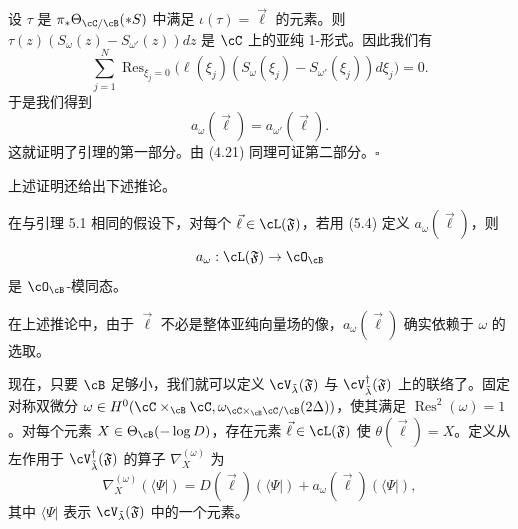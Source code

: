 


设 $\tau$ 是 $\pi_*\Theta_{\cC/\cB}(*S)$ 中满足 $\iota(\tau)=\vec\ell$ 的元素。则 $\tau(z)(S_\omega(z)-S_{\omega'}(z))dz$ 是 $\cC$ 上的亚纯 1-形式。因此我们有
\[
 \sum_{j=1}^{N}\operatorname{Res}_{\xi_j=0}
 \big(\ell(\xi_j)(S_\omega(\xi_j)-S_{\omega'}(\xi_j))d\xi_j\big)=0.
\]
于是我们得到
\[
 a_\omega(\vec\ell)=a_{\omega'}(\vec\ell).
\]
这就证明了引理的第一部分。由 (4.21) 同理可证第二部分。\hfill$\square$

上述证明还给出下述推论。

\begin{corollary}[5.2]
 在与引理 5.1 相同的假设下，对每个 $\vec\ell\in\cL(\mathfrak F)$，若用 (5.4) 定义 $a_\omega(\vec\ell)$，则
 \[
  a_\omega:\cL(\mathfrak F)\to\cO_\cB
 \]
 是 $\cO_\cB$-模同态。
\end{corollary}

\begin{remark}[5.3]
 在上述推论中，由于 $\vec\ell$ 不必是整体亚纯向量场的像，$a_\omega(\vec\ell)$ 确实依赖于 $\omega$ 的选取。
\end{remark}

现在，只要 $\cB$ 足够小，我们就可以定义 $\cV_{\tilde\lambda}(\mathfrak F)$ 与 $\cV^\dagger_{\tilde\lambda}(\mathfrak F)$ 上的联络了。固定对称双微分 $\omega\in H^0(\cC\times_\cB\cC,\omega_{\cC\times_\cB\cC/\cB}(2\Delta))$，使其满足 $\operatorname{Res}^2(\omega)=1$。对每个元素 $X\in\Theta_\cB(-\log D)$，存在元素 $\vec\ell\in\cL(\mathfrak F)$ 使 $\theta(\vec\ell)=X$。定义从左作用于 $\cV^\dagger_{\tilde\lambda}(\mathfrak F)$ 的算子 $\nabla^{(\omega)}_X$ 为
\begin{equation}
 \nabla^{(\omega)}_X(\langle\Psi|)=D(\vec\ell)(\langle\Psi|)+a_\omega(\vec\ell)(\langle\Psi|), \tag{5.5}
\end{equation}
其中 $\langle\Psi|$ 表示 $\cV_{\tilde\lambda}(\mathfrak F)$ 中的一个元素。

